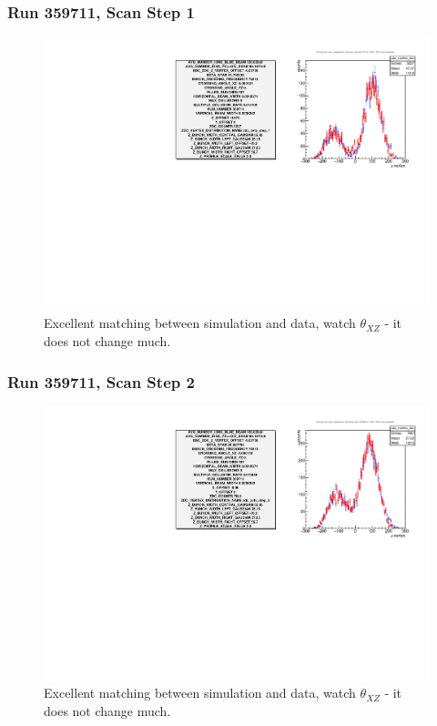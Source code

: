 \begin{frame}
\frametitle{Run 359711, Scan Step 1}
\begin{figure}
\begin{center}
\includegraphics[width=\linewidth]{"figures/359711_step_1_zdc_zvertex"}
\caption{Excellent matching between simulation and data, watch $\theta_{XZ}$ - it does not change much.}
\label{fig:359711_step_1_zdc_zvertex}
\end{center}\end{figure}
\end{frame}

\begin{frame}
\frametitle{Run 359711, Scan Step 2}
\begin{figure}
\begin{center}
\includegraphics[width=\linewidth]{"figures/359711_step_2_zdc_zvertex"}
\caption{Excellent matching between simulation and data, watch $\theta_{XZ}$ - it does not change much.}
\label{fig:359711_step_2_zdc_zvertex}
\end{center}\end{figure}
\end{frame}

